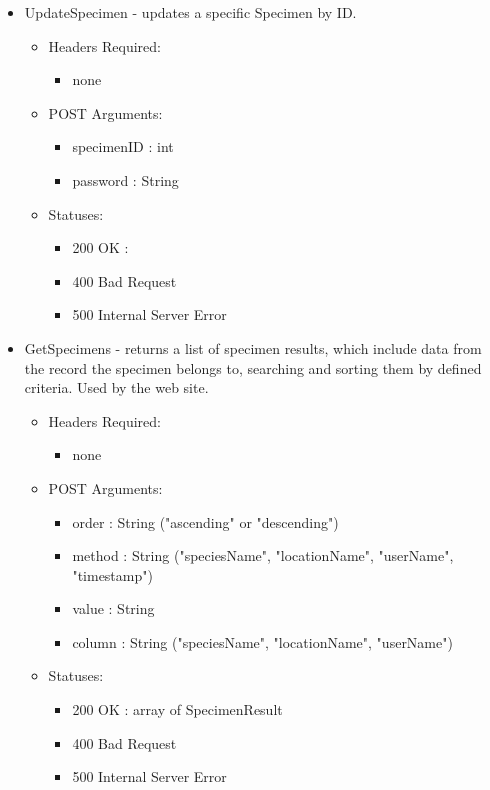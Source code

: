 \begin{itemize}
\begin{itemize}
\begin{itemize}
	\item UpdateSpecimen - updates a specific Specimen by ID.
        \begin{itemize}
        \item Headers Required:
        \begin{itemize}
              	\item none
        \end{itemize}
        \item POST Arguments:
        \begin{itemize}
              	\item specimenID : int
		\item password : String
        \end{itemize}
        \item Statuses: 
        \begin{itemize}
              	\item 200 OK :
              	\item 400 Bad Request
              	\item 500 Internal Server Error
        \end{itemize}
	    \end{itemize}


        \item GetSpecimens - returns a list of specimen results, which include data from the record the specimen belongs to, searching and sorting them by defined criteria. Used by the web site.
        \begin{itemize}
        \item Headers Required:
        \begin{itemize}
        	\item none
        \end{itemize}
        \item POST Arguments:
        \begin{itemize}
            \item order : String ("ascending" or "descending")
            \item method : String ("speciesName", "locationName", "userName", "timestamp")
            \item value : String
            \item column : String ("speciesName", "locationName", "userName")
        \end{itemize}
        \item Statuses: 
        \begin{itemize}
        	\item 200 OK : array of SpecimenResult
        	\item 400 Bad Request
        	\item 500 Internal Server Error
        \end{itemize}


\end{itemize}
\end{itemize}
\end{itemize}
\end{itemize}
